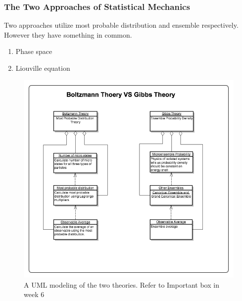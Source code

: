 \documentclass[letterpaper,10pt,english]{sphinxmanual}
\begin{document}
\subsubsection{The Two Approaches of Statistical Mechanics}
\label{equilibrium/summary1:the-two-approaches-of-statistical-mechanics}
Two approaches utilize most probable distribution and ensemble respectively. However they have something in common.
\begin{enumerate}
\item {} 
Phase space

\item {} 
Liouville equation

\end{enumerate}
\begin{figure}[htbp]
\centering
\capstart

\includegraphics[width=1.000\linewidth]{BoltzmannVSGibbs.png}
\caption{A UML modeling of the two theories. Refer to Important box in week 6}\end{figure}
\end{document}
